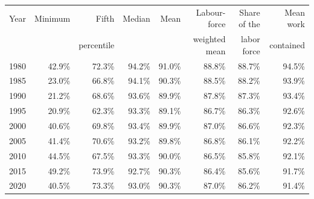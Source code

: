 \begin{tabular}{lrrrrrrr}
\hline\hline
Year & Minimum & Fifth & Median & Mean & Labour-force & Share of the & Mean work \\& & percentile & & & weighted mean & labor force & contained \\
\hline
1980 & 42.9\% & 72.3\% & 94.2\% & 91.0\% & 88.8\% & 88.7\% & 94.5\% \\
1985 & 23.0\% & 66.8\% & 94.1\% & 90.3\% & 88.5\% & 88.2\% & 93.9\% \\
1990 & 21.2\% & 68.6\% & 93.6\% & 89.9\% & 87.8\% & 87.3\% & 93.4\% \\
1995 & 20.9\% & 62.3\% & 93.3\% & 89.1\% & 86.7\% & 86.3\% & 92.6\% \\
2000 & 40.6\% & 69.8\% & 93.4\% & 89.9\% & 87.0\% & 86.6\% & 92.3\% \\
2005 & 41.4\% & 70.6\% & 93.2\% & 89.8\% & 86.8\% & 86.1\% & 92.2\% \\
2010 & 44.5\% & 67.5\% & 93.3\% & 90.0\% & 86.5\% & 85.8\% & 92.1\% \\
2015 & 49.2\% & 73.9\% & 92.7\% & 90.3\% & 86.4\% & 85.6\% & 91.7\% \\
2020 & 40.5\% & 73.3\% & 93.0\% & 90.3\% & 87.0\% & 86.2\% & 91.4\% \\
\hline\hline
\end{tabular}
